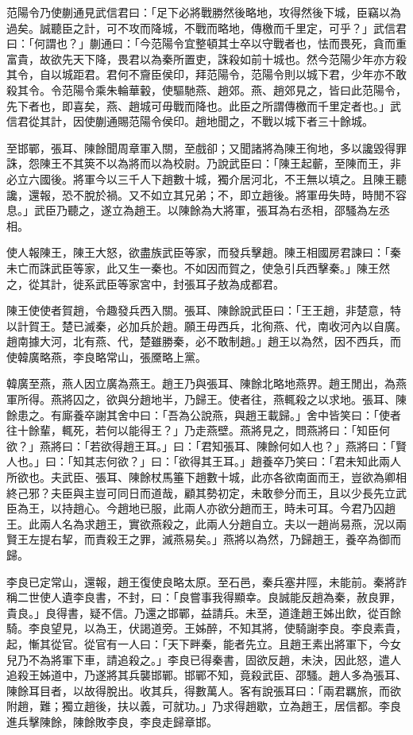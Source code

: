 \begin{pinyinscope}
范陽令乃使蒯通見武信君曰：「足下必將戰勝然後略地，攻得然後下城，臣竊以為過矣。誠聽臣之計，可不攻而降城，不戰而略地，傳檄而千里定，可乎？」武信君曰：「何謂也？」蒯通曰：「今范陽令宜整頓其士卒以守戰者也，怯而畏死，貪而重富貴，故欲先天下降，畏君以為秦所置吏，誅殺如前十城也。然今范陽少年亦方殺其令，自以城距君。君何不齎臣侯印，拜范陽令，范陽令則以城下君，少年亦不敢殺其令。令范陽令乘朱輪華轂，使驅馳燕、趙郊。燕、趙郊見之，皆曰此范陽令，先下者也，即喜矣，燕、趙城可毋戰而降也。此臣之所謂傳檄而千里定者也。」武信君從其計，因使蒯通賜范陽令侯印。趙地聞之，不戰以城下者三十餘城。

至邯鄲，張耳、陳餘聞周章軍入關，至戲卻；又聞諸將為陳王徇地，多以讒毀得罪誅，怨陳王不其筴不以為將而以為校尉。乃說武臣曰：「陳王起蘄，至陳而王，非必立六國後。將軍今以三千人下趙數十城，獨介居河北，不王無以填之。且陳王聽讒，還報，恐不脫於禍。又不如立其兄弟；不，即立趙後。將軍毋失時，時閒不容息。」武臣乃聽之，遂立為趙王。以陳餘為大將軍，張耳為右丞相，邵騷為左丞相。

使人報陳王，陳王大怒，欲盡族武臣等家，而發兵擊趙。陳王相國房君諫曰：「秦未亡而誅武臣等家，此又生一秦也。不如因而賀之，使急引兵西擊秦。」陳王然之，從其計，徙系武臣等家宮中，封張耳子敖為成都君。

陳王使使者賀趙，令趣發兵西入關。張耳、陳餘說武臣曰：「王王趙，非楚意，特以計賀王。楚已滅秦，必加兵於趙。願王毋西兵，北徇燕、代，南收河內以自廣。趙南據大河，北有燕、代，楚雖勝秦，必不敢制趙。」趙王以為然，因不西兵，而使韓廣略燕，李良略常山，張黡略上黨。

韓廣至燕，燕人因立廣為燕王。趙王乃與張耳、陳餘北略地燕界。趙王閒出，為燕軍所得。燕將囚之，欲與分趙地半，乃歸王。使者往，燕輒殺之以求地。張耳、陳餘患之。有廝養卒謝其舍中曰：「吾為公說燕，與趙王載歸。」舍中皆笑曰：「使者往十餘輩，輒死，若何以能得王？」乃走燕壁。燕將見之，問燕將曰：「知臣何欲？」燕將曰：「若欲得趙王耳。」曰：「君知張耳、陳餘何如人也？」燕將曰：「賢人也。」曰：「知其志何欲？」曰：「欲得其王耳。」趙養卒乃笑曰：「君未知此兩人所欲也。夫武臣、張耳、陳餘杖馬箠下趙數十城，此亦各欲南面而王，豈欲為卿相終己邪？夫臣與主豈可同日而道哉，顧其勢初定，未敢參分而王，且以少長先立武臣為王，以持趙心。今趙地已服，此兩人亦欲分趙而王，時未可耳。今君乃囚趙王。此兩人名為求趙王，實欲燕殺之，此兩人分趙自立。夫以一趙尚易燕，況以兩賢王左提右挈，而責殺王之罪，滅燕易矣。」燕將以為然，乃歸趙王，養卒為御而歸。

李良已定常山，還報，趙王復使良略太原。至石邑，秦兵塞井陘，未能前。秦將詐稱二世使人遺李良書，不封，曰：「良嘗事我得顯幸。良誠能反趙為秦，赦良罪，貴良。」良得書，疑不信。乃還之邯鄲，益請兵。未至，道逢趙王姊出飲，從百餘騎。李良望見，以為王，伏謁道旁。王姊醉，不知其將，使騎謝李良。李良素貴，起，慚其從官。從官有一人曰：「天下畔秦，能者先立。且趙王素出將軍下，今女兒乃不為將軍下車，請追殺之。」李良已得秦書，固欲反趙，未決，因此怒，遣人追殺王姊道中，乃遂將其兵襲邯鄲。邯鄲不知，竟殺武臣、邵騷。趙人多為張耳、陳餘耳目者，以故得脫出。收其兵，得數萬人。客有說張耳曰：「兩君羈旅，而欲附趙，難；獨立趙後，扶以義，可就功。」乃求得趙歇，立為趙王，居信都。李良進兵擊陳餘，陳餘敗李良，李良走歸章邯。


\end{pinyinscope}
